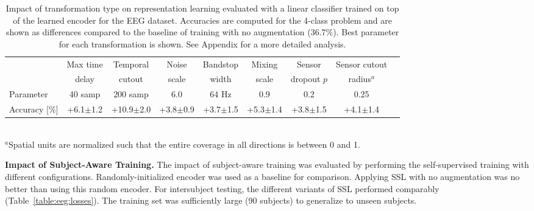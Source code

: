 \documentclass{article}
\newcommand{\std}[1]{{\scriptsize{$\pm$#1}}}
\renewcommand{\paragraph}[1]{\textbf{#1}\hspace{1em}}
\begin{document}
\begin{table}[h] \caption{Impact of transformation type on representation
  learning evaluated with a linear classifier trained on top of the learned
  encoder for the EEG dataset. Accuracies are computed for the 4-class problem
  and are shown as differences compared to the baseline of training with no
  augmentation (36.7\%). Best parameter for each transformation is
  shown. See Appendix for a more detailed analysis.}
  \label{table:eeg:aug:abbrev}
  \centering
  \small
  \begin{tabular}{lcccccccc}
    \toprule
    & Max time & Temporal & Noise & Bandstop & Mixing & Sensor      & Sensor cutout \\
    & delay    & cutout   & scale & width    & scale  & dropout $p$ & radius$^a$ \\
    \hline
    Parameter
    & 40 samp & 200 samp & 6.0 & 64 Hz & 0.9 & 0.2 & 0.25 \\
    Accuracy [\%]
    & +6.1\std{1.2} & +10.9\std{2.0} & +3.8\std{0.9} & +3.7\std{1.5}
    & +5.3\std{1.4} & +3.8\std{1.5} & +4.1\std{1.4}\\
    \bottomrule
  \end{tabular}\\
  \footnotesize{$^a$Spatial units are normalized such that the entire coverage
  in all directions is between 0 and 1.}
\end{table} 
\paragraph{Impact of Subject-Aware Training.}
The impact of subject-aware training was evaluated by performing the
self-supervised training with different configurations. Randomly-initialized
encoder was used as a baseline for comparison. Applying SSL with no augmentation
was no better than using this random encoder. For intersubject testing, the
different variants of SSL performed comparably (Table~\ref{table:eeg:losses}).
The training set was sufficiently large (90 subjects) to generalize to unseen
subjects.
\end{document}
